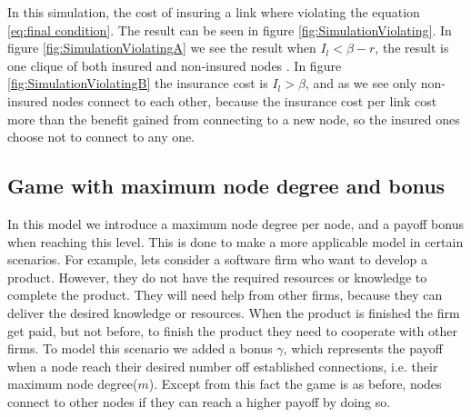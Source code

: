 In this simulation, the cost of insuring a link where violating the equation \ref{eq:final condition}. The result can be seen in figure \ref{fig:SimulationViolating}.  In figure \ref{fig:SimulationViolatingA} we see the result when $I_{l}<\beta-r$, the result is one clique of both insured and non-insured nodes . In figure \ref{fig:SimulationViolatingB} the insurance cost is $I_{l}>\beta$, and as we see only non-insured nodes connect to each other, because the insurance cost per link cost more than the benefit gained from connecting to a new node, so the insured ones choose not to connect to any one. 

\subsection{Game with maximum node degree and bonus}
In this model we introduce a maximum node degree per node, and a payoff bonus when reaching this level. This is done to make a more applicable model in certain scenarios. For example, lets consider a software firm who want to develop a product. However, they do not have the required resources or knowledge to complete the product. They will need help from other firms, because they can deliver the desired knowledge or resources. When the product is finished the firm get paid, but not before, to finish the product they need to cooperate with other firms.
To model this scenario we added a bonus $\gamma$, which represents the payoff when a node reach their desired number off established connections, i.e. their maximum node degree($m$). Except from this fact the game is as before, nodes connect to other nodes if they can reach a higher payoff by doing so. 



